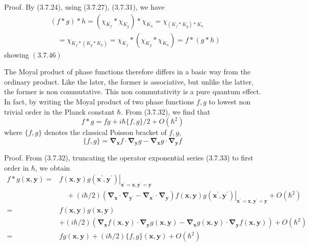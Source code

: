 \documentclass{article}
\begin{document}
Proof. By (3.7.24), using (3.7.27), (3.7.31), we have
$$
\begin{align*}
& (f * g) * h=\left(\chi_{K_{f}} * \chi_{K_{g}}\right) * \chi_{K_{h}}=\chi_{\left(K_{f} * K_{g}\right) * K_{h}}  \tag{3.7.47}\\
& \quad=\chi_{K_{f} *\left(K_{g} * K_{h}\right)}=\chi_{K_{f}} *\left(\chi_{K_{g}} * \chi_{K_{h}}\right)=f *(g * h)
\end{align*}
$$
showing $(3.7 .46)$

The Moyal product of phase functions therefore differs in a basic way from the
ordinary product. Like the later, the former is associative, but unlike the latter, the former is non commutative. This non commutativity is a pure quantum effect. In fact, by writing the Moyal product of two phase functions $f, g$ to lowest non trivial order in the Planck constant $\hbar$. From (3.7.32), we find that
$$
\begin{equation*}
f * g=f g+i \hbar\{f, g\} / 2+O\left(\hbar^{2}\right) \tag{3.7.48}
\end{equation*}
$$
where $\{f, g\}$ denotes the classical Poisson bracket of $f, g$,
$$
\begin{equation*}
\{f, g\}=\boldsymbol{\nabla}_{\boldsymbol{x}} f \cdot \boldsymbol{\nabla}_{\boldsymbol{y}} g-\boldsymbol{\nabla}_{\boldsymbol{x}} g \cdot \boldsymbol{\nabla}_{\boldsymbol{y}} f \tag{3.7.49}
\end{equation*}
$$

Proof. From (3.7.32), truncating the operator exponential series (3.7.33) to first order in $\hbar$, we obtain
$$
\begin{align*}
f * g(\boldsymbol{x}, \boldsymbol{y})= & \left.f(\boldsymbol{x}, \boldsymbol{y}) g\left(\boldsymbol{x}^{\prime}, \boldsymbol{y}^{\prime}\right)\right|_{\boldsymbol{x}^{\prime}=\boldsymbol{x}, \boldsymbol{y}^{\prime}=\boldsymbol{y}}  \tag{3.7.50}\\
& \quad+\left.(i \hbar / 2)\left(\boldsymbol{\nabla}_{\boldsymbol{x}} \cdot \boldsymbol{\nabla}_{\boldsymbol{y}^{\prime}}-\boldsymbol{\nabla}_{\boldsymbol{x}^{\prime}} \cdot \boldsymbol{\nabla}_{\boldsymbol{y}}\right) f(\boldsymbol{x}, \boldsymbol{y}) g\left(\boldsymbol{x}^{\prime}, \boldsymbol{y}^{\prime}\right)\right|_{\boldsymbol{x}^{\prime}=\boldsymbol{x}, \boldsymbol{y}^{\prime}=\boldsymbol{y}}+O\left(\hbar^{2}\right) \\
= & f(\boldsymbol{x}, \boldsymbol{y}) g(\boldsymbol{x}, \boldsymbol{y}) \\
& +(i \hbar / 2)\left(\boldsymbol{\nabla}_{\boldsymbol{x}} f(\boldsymbol{x}, \boldsymbol{y}) \cdot \boldsymbol{\nabla}_{\boldsymbol{y}} g(\boldsymbol{x}, \boldsymbol{y})-\boldsymbol{\nabla}_{\boldsymbol{x}} g(\boldsymbol{x}, \boldsymbol{y}) \cdot \boldsymbol{\nabla}_{\boldsymbol{y}} f(\boldsymbol{x}, \boldsymbol{y})\right)+O\left(\hbar^{2}\right) \\
= & f g(\boldsymbol{x}, \boldsymbol{y})+(i \hbar / 2)\{f, g\}(\boldsymbol{x}, \boldsymbol{y})+O\left(\hbar^{2}\right)
\end{align*}
$$
\end{document}
